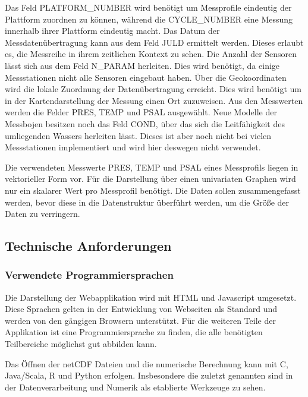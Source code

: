 Das Feld PLATFORM\_NUMBER wird benötigt um Messprofile eindeutig der Plattform zuordnen zu können, während die CYCLE\_NUMBER eine Messung innerhalb ihrer Plattform eindeutig macht. Das Datum der Messdatenübertragung kann aus dem Feld JULD ermittelt werden. Dieses erlaubt es, die Messreihe in ihrem zeitlichen Kontext zu sehen. Die Anzahl der Sensoren lässt sich aus dem Feld N\_PARAM herleiten. Dies wird benötigt, da einige Messstationen nicht alle Sensoren eingebaut haben. Über die Geokoordinaten wird die lokale Zuordnung der Datenübertragung erreicht. Dies wird benötigt um in der Kartendarstellung der Messung einen Ort zuzuweisen.
Aus den Messwerten werden die Felder PRES, TEMP und PSAL ausgewählt. Neue Modelle der Messbojen besitzen noch das Feld COND, über das sich die Leitfähigkeit des umliegenden Wassers herleiten lässt. Dieses ist aber noch nicht bei vielen Messstationen implementiert und wird hier deswegen nicht verwendet.

Die verwendeten Messwerte PRES, TEMP und PSAL eines Messprofils liegen in vektorieller Form vor. Für die Darstellung über einen univariaten Graphen wird nur ein skalarer Wert pro Messprofil benötigt. Die Daten sollen zusammengefasst werden, bevor diese in die Datenstruktur überführt werden, um die Größe der Daten zu verringern.


\subsection{Technische Anforderungen  }

\subsubsection{Verwendete Programmiersprachen}

Die Darstellung der Webapplikation wird mit \gls{HTML} und Javascript umgesetzt. Diese Sprachen gelten in der Entwicklung von Webseiten als Standard und werden von den gängigen Browsern unterstützt.
Für die weiteren Teile der Applikation ist eine Programmiersprache zu finden, die alle benötigten Teilbereiche möglichst gut abbilden kann.

Das Öffnen der \gls{netCDF} Dateien und die numerische Berechnung kann mit C, Java/Scala, R und Python erfolgen. Insbesondere die zuletzt genannten sind in der Datenverarbeitung und Numerik als etablierte Werkzeuge zu sehen.


